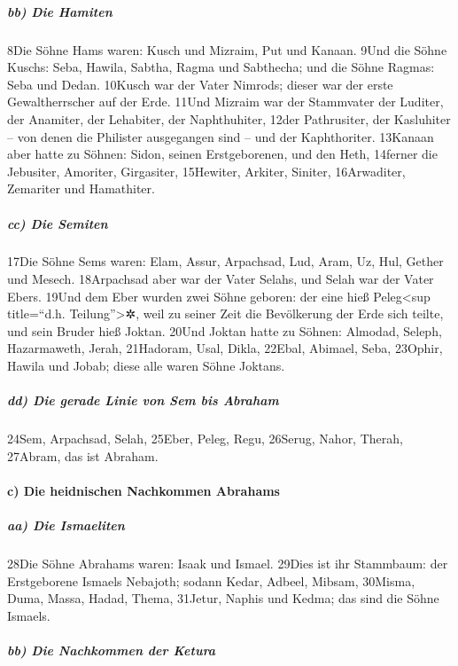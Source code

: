 \hypertarget{bb-die-hamiten}{%
\subparagraph{bb) Die Hamiten}\label{bb-die-hamiten}}

8Die Söhne Hams waren: Kusch und Mizraim, Put und Kanaan. 9Und die Söhne
Kuschs: Seba, Hawila, Sabtha, Ragma und Sabthecha; und die Söhne Ragmas:
Seba und Dedan. 10Kusch war der Vater Nimrods; dieser war der erste
Gewaltherrscher auf der Erde. 11Und Mizraim war der Stammvater der
Luditer, der Anamiter, der Lehabiter, der Naphthuhiter, 12der
Pathrusiter, der Kasluhiter -- von denen die Philister ausgegangen sind
-- und der Kaphthoriter. 13Kanaan aber hatte zu Söhnen: Sidon, seinen
Erstgeborenen, und den Heth, 14ferner die Jebusiter, Amoriter,
Girgasiter, 15Hewiter, Arkiter, Siniter, 16Arwaditer, Zemariter und
Hamathiter.

\hypertarget{cc-die-semiten}{%
\subparagraph{cc) Die Semiten}\label{cc-die-semiten}}

17Die Söhne Sems waren: Elam, Assur, Arpachsad, Lud, Aram, Uz, Hul,
Gether und Mesech. 18Arpachsad aber war der Vater Selahs, und Selah war
der Vater Ebers. 19Und dem Eber wurden zwei Söhne geboren: der eine hieß
Peleg\textless sup title=``d.h. Teilung''\textgreater✲, weil zu seiner
Zeit die Bevölkerung der Erde sich teilte, und sein Bruder hieß Joktan.
20Und Joktan hatte zu Söhnen: Almodad, Seleph, Hazarmaweth, Jerah,
21Hadoram, Usal, Dikla, 22Ebal, Abimael, Seba, 23Ophir, Hawila und
Jobab; diese alle waren Söhne Joktans.

\hypertarget{dd-die-gerade-linie-von-sem-bis-abraham}{%
\subparagraph{dd) Die gerade Linie von Sem bis
Abraham}\label{dd-die-gerade-linie-von-sem-bis-abraham}}

24Sem, Arpachsad, Selah, 25Eber, Peleg, Regu, 26Serug, Nahor, Therah,
27Abram, das ist Abraham.

\hypertarget{c-die-heidnischen-nachkommen-abrahams}{%
\paragraph{c) Die heidnischen Nachkommen
Abrahams}\label{c-die-heidnischen-nachkommen-abrahams}}

\hypertarget{aa-die-ismaeliten}{%
\subparagraph{aa) Die Ismaeliten}\label{aa-die-ismaeliten}}

28Die Söhne Abrahams waren: Isaak und Ismael. 29Dies ist ihr Stammbaum:
der Erstgeborene Ismaels Nebajoth; sodann Kedar, Adbeel, Mibsam,
30Misma, Duma, Massa, Hadad, Thema, 31Jetur, Naphis und Kedma; das sind
die Söhne Ismaels.

\hypertarget{bb-die-nachkommen-der-ketura}{%
\subparagraph{bb) Die Nachkommen der
Ketura}\label{bb-die-nachkommen-der-ketura}}

